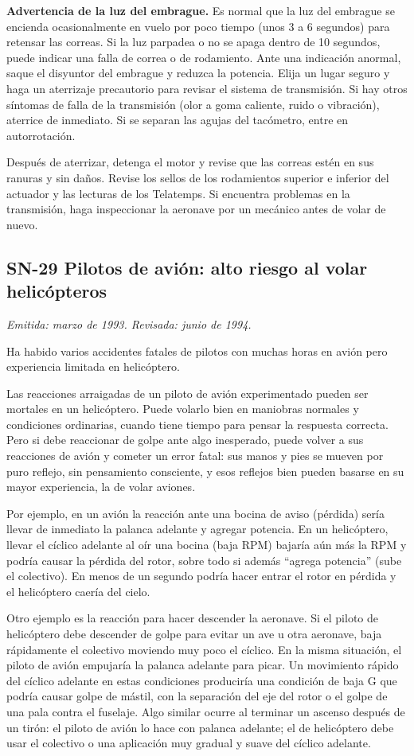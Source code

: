 \textbf{Advertencia de la luz del embrague.} Es normal que la luz del embrague se encienda ocasionalmente en vuelo por poco tiempo (unos 3 a 6 segundos) para retensar las correas. Si la luz parpadea o no se apaga dentro de 10 segundos, puede indicar una falla de correa o de rodamiento. Ante una indicación anormal, saque el disyuntor del embrague y reduzca la potencia. Elija un lugar seguro y haga un aterrizaje precautorio para revisar el sistema de transmisión. Si hay otros síntomas de falla de la transmisión (olor a goma caliente, ruido o vibración), aterrice de inmediato. Si se separan las agujas del tacómetro, entre en autorrotación.

Después de aterrizar, detenga el motor y revise que las correas estén en sus ranuras y sin daños. Revise los sellos de los rodamientos superior e inferior del actuador y las lecturas de los Telatemps. Si encuentra problemas en la transmisión, haga inspeccionar la aeronave por un mecánico antes de volar de nuevo.

\subsection*{SN-29 \quad Pilotos de avión: alto riesgo al volar helicópteros}
{\small\textit{Emitida: marzo de 1993. Revisada: junio de 1994.}}

Ha habido varios accidentes fatales de pilotos con muchas horas en avión pero experiencia limitada en helicóptero.

Las reacciones arraigadas de un piloto de avión experimentado pueden ser mortales en un helicóptero. Puede volarlo bien en maniobras normales y condiciones ordinarias, cuando tiene tiempo para pensar la respuesta correcta. Pero si debe reaccionar de golpe ante algo inesperado, puede volver a sus reacciones de avión y cometer un error fatal: sus manos y pies se mueven por puro reflejo, sin pensamiento consciente, y esos reflejos bien pueden basarse en su mayor experiencia, la de volar aviones.

Por ejemplo, en un avión la reacción ante una bocina de aviso (pérdida) sería llevar de inmediato la palanca adelante y agregar potencia. En un helicóptero, llevar el cíclico adelante al oír una bocina (baja RPM) bajaría aún más la RPM y podría causar la pérdida del rotor, sobre todo si además ``agrega potencia'' (sube el colectivo). En menos de un segundo podría hacer entrar el rotor en pérdida y el helicóptero caería del cielo.

Otro ejemplo es la reacción para hacer descender la aeronave. Si el piloto de helicóptero debe descender de golpe para evitar un ave u otra aeronave, baja rápidamente el colectivo moviendo muy poco el cíclico. En la misma situación, el piloto de avión empujaría la palanca adelante para picar. Un movimiento rápido del cíclico adelante en estas condiciones produciría una condición de baja G que podría causar golpe de mástil, con la separación del eje del rotor o el golpe de una pala contra el fuselaje. Algo similar ocurre al terminar un ascenso después de un tirón: el piloto de avión lo hace con palanca adelante; el de helicóptero debe usar el colectivo o una aplicación muy gradual y suave del cíclico adelante.

